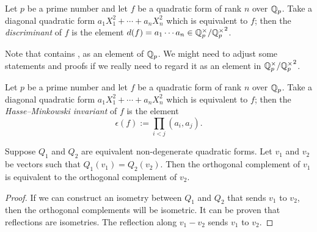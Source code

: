 \begin{definition}\label{def:discr}
\mathlibok
{}
Let $p$ be a prime number and let $f$ be a quadratic form of rank $n$ over $\mathbb{Q}_p$. Take a diagonal quadratic form $a_1X_1^2 + \cdots + a_nX_n^2$ which is equivalent to $f$; then the \emph{discriminant} of $f$ is the element $d(f) = a_1 \cdots a_n \in \mathbb{Q}_p^\times/{\mathbb{Q}_p^\times}^2$.

Note that \mathlib contains , as an element of $\mathbb{Q}_p$. We might need to adjust some statements and proofs if we really need to regard it as an element in $\mathbb{Q}_p^\times/{\mathbb{Q}_p^\times}^2$.
\end{definition}

\begin{definition}\label{def:HM_inv}
\leanok
Let $p$ be a prime number and let $f$ be a quadratic form of rank $n$ over $\mathbb{Q}_p$. Take a diagonal quadratic form $a_1X_1^2 + \cdots + a_nX_n^2$ which is equivalent to $f$; then the \emph{Hasse--Minkowski invariant} of $f$ is the element
\[ \epsilon(f) := \prod_{i < j}(a_i, a_j).\]
\end{definition}

\begin{lemma}\label{lem:WittTheorem}
\leanok
Suppose $Q_1$ and $Q_2$ are equivalent non-degenerate quadratic forms. Let $v_1$ and $v_2$ be vectors such that $Q_1(v_1) = Q_2(v_2)$. Then the orthogonal complement of $v_1$ is equivalent to the orthogonal complement of $v_2$.
\end{lemma}
\begin{proof}
If we can construct an isometry between $Q_1$ and $Q_2$ that sends $v_1$ to $v_2$, then the orthogonal complements will be isometric.
It can be proven that reflections are isometries. The reflection along $v_1 - v_2$ sends $v_1$ to $v_2$.
\end{proof}

